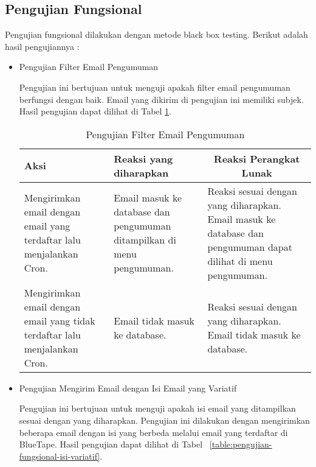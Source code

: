 \subsection{Pengujian Fungsional}
Pengujian fungsional dilakukan dengan metode black box testing. Berikut adalah hasil pengujiannya :
\begin{itemize}
  \item Pengujian Filter Email Pengumuman

    Pengujian ini bertujuan untuk menguji apakah filter email pengumuman berfungsi dengan baik. Email yang dikirim di pengujian ini memiliki subjek. Hasil pengujian dapat dilihat di Tabel \ref{table:pengujian-fungsional-filter-email}.

    \begin{center}
      \begin{table}[H]
        \caption{Pengujian Filter Email Pengumuman}
        \label{table:pengujian-fungsional-filter-email}
        \begin{tabular}{|p{5cm}|p{5cm}|p{5cm}|}
        \hline
        \centering Aksi	& 	\centering Reaksi yang diharapkan &  \multicolumn{1}{c|}{Reaksi Perangkat Lunak} \\
        \hline
        Mengirimkan email dengan email yang terdaftar lalu menjalankan Cron. & Email masuk ke database dan pengumuman ditampilkan di menu pengumuman. & Reaksi sesuai dengan yang diharapkan. Email masuk ke database dan pengumuman dapat dilihat di menu pengumuman. \\
        \hline
        Mengirimkan email dengan email yang tidak terdaftar lalu menjalankan Cron. & Email tidak masuk ke database. & Reaksi sesuai dengan yang diharapkan. Email tidak masuk ke database. \\
        \hline
        \end{tabular}
    \end{table}
    \end{center}

  \item Pengujian Mengirim Email dengan Isi Email yang Variatif

    Pengujian ini bertujuan untuk menguji apakah isi email yang ditampilkan sesuai dengan yang diharapkan. Pengujian ini dilakukan dengan mengirimkan beberapa email dengan isi yang berbeda melalui email yang terdaftar di BlueTape. Hasil pengujian dapat dilihat di Tabel ~\ref{table:pengujian-fungsional-isi-variatif}.


\end{itemize}
